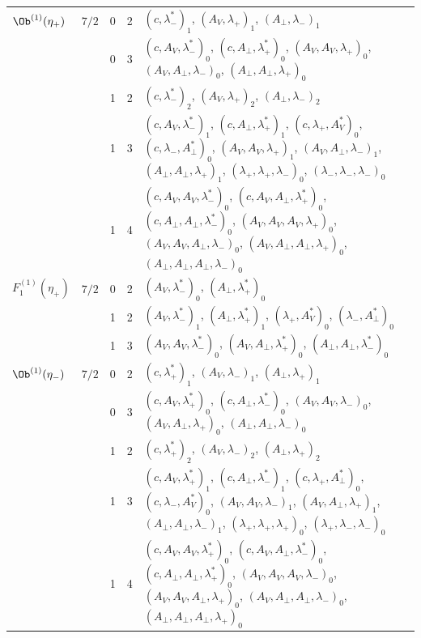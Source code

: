 {\begin{longtable}{>{\raggedright}p{2.3cm}|p{0.6cm}|p{0.25cm}|p{0.25cm}|>{\raggedright\arraybackslash}p{11.6cm}}
\hline
$\Ob^{(1)}(\eta_+)$ & $7/2$ & 0 & 2 & $(c,\lambda^*_-)_{1}$, $(A_V,\lambda_+)_{1}$, $(A_\perp,\lambda_-)_{1}$ \\
 &  & 0 & 3 & $(c,A_V,\lambda^*_-)_{0}$, $(c,A_\perp,\lambda^*_+)_{0}$, $(A_V,A_V,\lambda_+)_{0}$, $(A_V,A_\perp,\lambda_-)_{0}$, $(A_\perp,A_\perp,\lambda_+)_{0}$ \\
 &  & 1 & 2 & $(c,\lambda^*_-)_{2}$, $(A_V,\lambda_+)_{2}$, $(A_\perp,\lambda_-)_{2}$ \\
 &  & 1 & 3 & $(c,A_V,\lambda^*_-)_{1}$, $(c,A_\perp,\lambda^*_+)_{1}$, $(c,\lambda_+,A^*_V)_{0}$, $(c,\lambda_-,A^*_\perp)_{0}$, $(A_V,A_V,\lambda_+)_{1}$, $(A_V,A_\perp,\lambda_-)_{1}$, $(A_\perp,A_\perp,\lambda_+)_{1}$, $(\lambda_+,\lambda_+,\lambda_-)_{0}$, $(\lambda_-,\lambda_-,\lambda_-)_{0}$ \\
 &  & 1 & 4 & $(c,A_V,A_V,\lambda^*_-)_{0}$, $(c,A_V,A_\perp,\lambda^*_+)_{0}$, $(c,A_\perp,A_\perp,\lambda^*_-)_{0}$, $(A_V,A_V,A_V,\lambda_+)_{0}$, $(A_V,A_V,A_\perp,\lambda_-)_{0}$, $(A_V,A_\perp,A_\perp,\lambda_+)_{0}$, $(A_\perp,A_\perp,A_\perp,\lambda_-)_{0}$ \\
\hline
$F_1^{(1)}(\eta_+)$ & $7/2$ & 0 & 2 & $(A_V,\lambda^*_-)_{0}$, $(A_\perp,\lambda^*_+)_{0}$ \\
 &  & 1 & 2 & $(A_V,\lambda^*_-)_{1}$, $(A_\perp,\lambda^*_+)_{1}$, $(\lambda_+,A^*_V)_{0}$, $(\lambda_-,A^*_\perp)_{0}$ \\
 &  & 1 & 3 & $(A_V,A_V,\lambda^*_-)_{0}$, $(A_V,A_\perp,\lambda^*_+)_{0}$, $(A_\perp,A_\perp,\lambda^*_-)_{0}$ \\
\hline
$\Ob^{(1)}(\eta_-)$ & $7/2$ & 0 & 2 & $(c,\lambda^*_+)_{1}$, $(A_V,\lambda_-)_{1}$, $(A_\perp,\lambda_+)_{1}$ \\
 &  & 0 & 3 & $(c,A_V,\lambda^*_+)_{0}$, $(c,A_\perp,\lambda^*_-)_{0}$, $(A_V,A_V,\lambda_-)_{0}$, $(A_V,A_\perp,\lambda_+)_{0}$, $(A_\perp,A_\perp,\lambda_-)_{0}$ \\
 &  & 1 & 2 & $(c,\lambda^*_+)_{2}$, $(A_V,\lambda_-)_{2}$, $(A_\perp,\lambda_+)_{2}$ \\
 &  & 1 & 3 & $(c,A_V,\lambda^*_+)_{1}$, $(c,A_\perp,\lambda^*_-)_{1}$, $(c,\lambda_+,A^*_\perp)_{0}$, $(c,\lambda_-,A^*_V)_{0}$, $(A_V,A_V,\lambda_-)_{1}$, $(A_V,A_\perp,\lambda_+)_{1}$, $(A_\perp,A_\perp,\lambda_-)_{1}$, $(\lambda_+,\lambda_+,\lambda_+)_{0}$, $(\lambda_+,\lambda_-,\lambda_-)_{0}$ \\
 &  & 1 & 4 & $(c,A_V,A_V,\lambda^*_+)_{0}$, $(c,A_V,A_\perp,\lambda^*_-)_{0}$, $(c,A_\perp,A_\perp,\lambda^*_+)_{0}$, $(A_V,A_V,A_V,\lambda_-)_{0}$, $(A_V,A_V,A_\perp,\lambda_+)_{0}$, $(A_V,A_\perp,A_\perp,\lambda_-)_{0}$, $(A_\perp,A_\perp,A_\perp,\lambda_+)_{0}$ \\

\end{longtable}}

